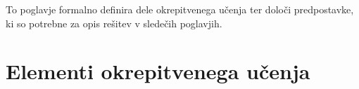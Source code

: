 \documentclass[a4paper, oneside, 12pt]{report}
\begin{document}



To poglavje formalno definira dele okrepitvenega učenja ter določi predpostavke, ki so potrebne za opis rešitev v sledečih poglavjih.

\section{Elementi okrepitvenega učenja} \label{section:ReinforcementLearningElements}
\end{document}
